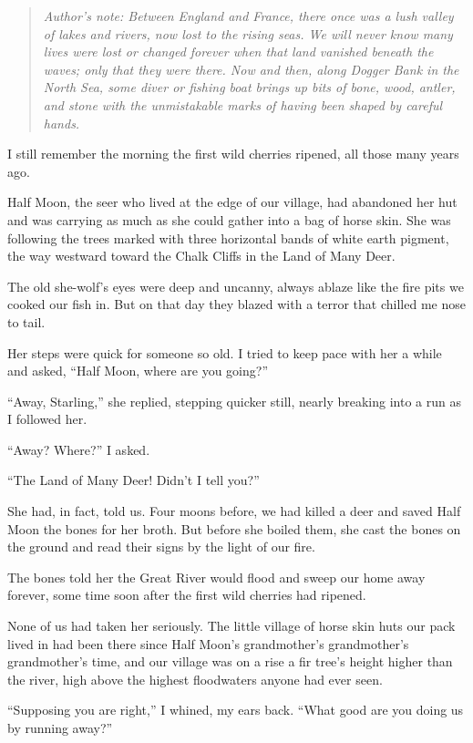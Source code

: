 \begin{quote}
  \emph{Author's note: Between England and France, there once was a lush valley of lakes and rivers, now lost to the rising seas. We will never know many lives were lost or changed forever when that land vanished beneath the waves; only that they were there. Now and then, along Dogger Bank in the North Sea, some diver or fishing boat brings up bits of bone, wood, antler, and stone with the unmistakable marks of having been shaped by careful hands.}
\end{quote}

I still remember the morning the first wild cherries ripened, all those many years ago.

Half Moon, the seer who lived at the edge of our village, had abandoned her hut and was carrying as much as she could gather into a bag of horse skin. She was following the trees marked with three horizontal bands of white earth pigment, the way westward toward the Chalk Cliffs in the Land of Many Deer.

The old she-wolf's eyes were deep and uncanny, always ablaze like the fire pits we cooked our fish in. But on that day they blazed with a terror that chilled me nose to tail.

Her steps were quick for someone so old. I tried to keep pace with her a while and asked, ``Half Moon, where are you going?''

``Away, Starling,'' she replied, stepping quicker still, nearly breaking into a run as I followed her.

``Away? Where?'' I asked.

``The Land of Many Deer! Didn't I tell you?''

She had, in fact, told us. Four moons before, we had killed a deer and saved Half Moon the bones for her broth. But before she boiled them, she cast the bones on the ground and read their signs by the light of our fire.

The bones told her the Great River would flood and sweep our home away forever, some time soon after the first wild cherries had ripened.

None of us had taken her seriously. The little village of horse skin huts our pack lived in had been there since Half Moon's grandmother's grandmother's grandmother's time, and our village was on a rise a fir tree's height higher than the river, high above the highest floodwaters anyone had ever seen.

``Supposing you are right,'' I whined, my ears back. ``What good are you doing us by running away?''

